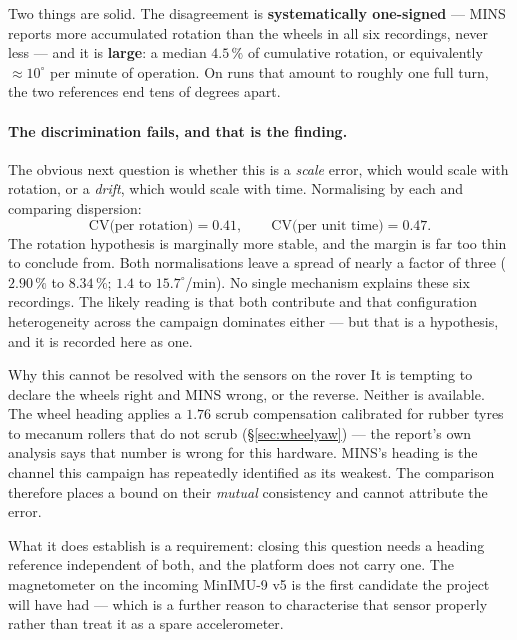 \noindent Two things are solid. The disagreement is \textbf{systematically
one-signed} --- MINS reports more accumulated rotation than the wheels in
all six recordings, never less --- and it is \textbf{large}: a median
$4.5\,\%$ of cumulative rotation, or equivalently ${\approx}10^\circ$ per
minute of operation. On runs that amount to roughly one full turn, the two
references end tens of degrees apart.

\paragraph{The discrimination fails, and that is the finding.}
The obvious next question is whether this is a \emph{scale} error, which
would scale with rotation, or a \emph{drift}, which would scale with time.
Normalising by each and comparing dispersion:
\begin{equation}
\mathrm{CV}\bigl(\text{per rotation}\bigr) = 0.41,
\qquad
\mathrm{CV}\bigl(\text{per unit time}\bigr) = 0.47 .
\end{equation}
The rotation hypothesis is marginally more stable, and the margin is far too
thin to conclude from. Both normalisations leave a spread of nearly a factor
of three ($2.90\,\%$ to $8.34\,\%$; $1.4$ to $15.7^\circ$/min). No single
mechanism explains these six recordings. The likely reading is that both
contribute and that configuration heterogeneity across the campaign
dominates either --- but that is a hypothesis, and it is recorded here as
one.

\begin{trapbox}{Why this cannot be resolved with the sensors on the rover}
It is tempting to declare the wheels right and MINS wrong, or the reverse.
Neither is available. The wheel heading applies a $1.76$ scrub
compensation calibrated for rubber tyres to mecanum rollers that do not
scrub (\S\ref{sec:wheelyaw}) --- the report's own analysis says that number
is wrong for this hardware. MINS's heading is the channel this campaign has
repeatedly identified as its weakest. The comparison therefore places a
bound on their \emph{mutual} consistency and cannot attribute the error.

What it does establish is a requirement: closing this question needs a
heading reference independent of both, and the platform does not carry one.
The magnetometer on the incoming MinIMU-9 v5 is the first candidate the
project will have had --- which is a further reason to characterise that
sensor properly rather than treat it as a spare accelerometer.
\end{trapbox}

